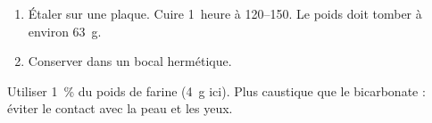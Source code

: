 \begin{ingredients}
\end{ingredients}

\begin{recipe}
  \begin{enumerate}

  \item Étaler sur une plaque.  Cuire 1~heure à 120--150\degreeC.  Le
    poids doit tomber à environ 63~g.

  \item Conserver dans un bocal hermétique.

  \end{enumerate}
\end{recipe}

Utiliser 1~\% du poids de farine (4~g ici).  Plus caustique que le
bicarbonate : éviter le contact avec la peau et les yeux.

